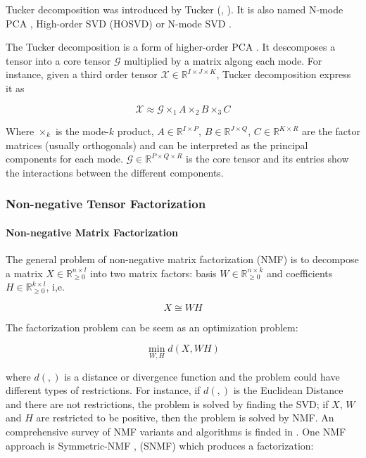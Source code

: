 \documentclass[letterpaper,12pt]{article}
\begin{document}
Tucker decomposition was introduced by Tucker (\cite{Tucker1963}, \cite{Tucker1964}). It is also named N-mode PCA \cite{Kapteyn1986}, High-order SVD (HOSVD) \cite{DeLathauwer2000} or N-mode SVD \cite{Vasilescu2002}.

The Tucker decomposition is a form of higher-order PCA \cite{Kolda2009}. It descomposes a tensor into a core tensor $\mathcal{G}$ multiplied by a matrix algong each mode. For instance, given a third order tensor $\mathcal{X}\in\mathbb{R}^{I\times J\times K}$, Tucker decomposition express it as 

\begin{equation}
 \mathcal{X}\approx \mathcal{G}\times_1 A \times_2 B \times_3 C
\end{equation}

Where $\times_k$ is the mode-$k$ product, $A\in \mathbb{R}^{I\times P}$, $B\in \mathbb{R}^{J\times Q}$, $C\in \mathbb{R}^{K\times R}$ are the factor matrices (usually orthogonals) and can be interpreted as the principal components for each mode. $\mathcal{G}\in\mathbb{R}^{P\times Q \times R}$ is the core tensor and its entries show the interactions between the different components.

\subsubsection{Non-negative Tensor Factorization}

\paragraph{Non-negative Matrix Factorization}

The general problem of non-negative matrix factorization (NMF) is to decompose a matrix $X \in \mathbb{R}_{\geq 0}^{n\times l}$ into two matrix factors: basis $W \in \mathbb{R}_{\geq 0}^{n\times k}$  and coefficients $H \in \mathbb{R}_{\geq 0}^{k\times l}$, i,e.

\begin{equation}
X\cong W H\label{eq:matrix-factorization}
\end{equation}
 
The factorization problem can be seem as an optimization problem:

\begin{equation}
\min_{W,H}d(X,WH)\label{eq:objective-function-factorization}
\end{equation}


where $d(,)$ is a distance or divergence function and the problem could have different types of restrictions. For instance, if $d(,)$
is the Euclidean Distance and there are not restrictions, the problem is solved by finding the SVD; if $X$, $W$ and $H$ are restricted
to be positive, then the problem is solved by NMF. An comprehensive survey of NMF variants and algorithms is finded in \cite{Wang2013}.
One NMF approach is Symmetric-NMF \cite{Ding2005}, (SNMF) which produces a factorization: 
\end{document}
